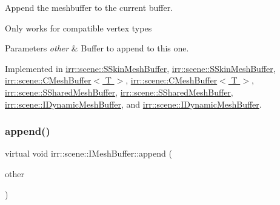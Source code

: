 Append the meshbuffer to the current buffer. 

Only works for compatible vertex types 
\begin{DoxyParams}{Parameters}
{\em other} & Buffer to append to this one. \\
\hline
\end{DoxyParams}


Implemented in \hyperlink{structirr_1_1scene_1_1SSkinMeshBuffer_a5395bc06c4c6b1c9a82dbdd56916a9e0}{irr\+::scene\+::\+S\+Skin\+Mesh\+Buffer}, \hyperlink{structirr_1_1scene_1_1SSkinMeshBuffer_a5395bc06c4c6b1c9a82dbdd56916a9e0}{irr\+::scene\+::\+S\+Skin\+Mesh\+Buffer}, \hyperlink{classirr_1_1scene_1_1CMeshBuffer_af48b88e6c1bd79e6abd6a6803aa106c0}{irr\+::scene\+::\+C\+Mesh\+Buffer$<$ T $>$}, \hyperlink{classirr_1_1scene_1_1CMeshBuffer_af48b88e6c1bd79e6abd6a6803aa106c0}{irr\+::scene\+::\+C\+Mesh\+Buffer$<$ T $>$}, \hyperlink{structirr_1_1scene_1_1SSharedMeshBuffer_aa4fbcc497cfd0b431bb85d607ed6a2fb}{irr\+::scene\+::\+S\+Shared\+Mesh\+Buffer}, \hyperlink{structirr_1_1scene_1_1SSharedMeshBuffer_aa4fbcc497cfd0b431bb85d607ed6a2fb}{irr\+::scene\+::\+S\+Shared\+Mesh\+Buffer}, \hyperlink{classirr_1_1scene_1_1IDynamicMeshBuffer_aada30374517d2a52d6264b6359a1e35c}{irr\+::scene\+::\+I\+Dynamic\+Mesh\+Buffer}, and \hyperlink{classirr_1_1scene_1_1IDynamicMeshBuffer_aada30374517d2a52d6264b6359a1e35c}{irr\+::scene\+::\+I\+Dynamic\+Mesh\+Buffer}.

\mbox{\label{classirr_1_1scene_1_1IMeshBuffer_a79d2737962579138183ed0fd324310b3}} 
\subsubsection{\texorpdfstring{append()}{append()}\hspace{0.1cm}{\footnotesize\ttfamily [4/4]}}
{\footnotesize\ttfamily virtual void irr\+::scene\+::\+I\+Mesh\+Buffer\+::append (\begin{DoxyParamCaption}\item[{const \hyperlink{classirr_1_1scene_1_1IMeshBuffer}{I\+Mesh\+Buffer} $\ast$const}]{other }\end{DoxyParamCaption})\hspace{0.3cm}{\ttfamily [pure virtual]}}



